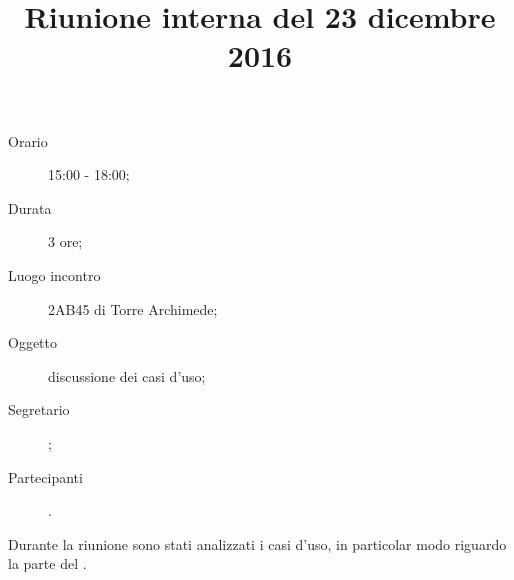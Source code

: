 


\author{\PB}
\supervisor{\MM}
\title{Riunione interna del 23 dicembre 2016}



\maketitle

\begin{description}
	\item[Orario] 15:00 - 18:00;
	\item[Durata] 3 ore;
	\item[Luogo incontro] 2AB45 di Torre Archimede; 
	\item[Oggetto] discussione dei casi d'uso;
	\item[Segretario] \PB; 
	\item[Partecipanti] \ALL.
\end{description}

Durante la riunione sono stati analizzati i casi d'uso, in particolar modo riguardo la parte del .


